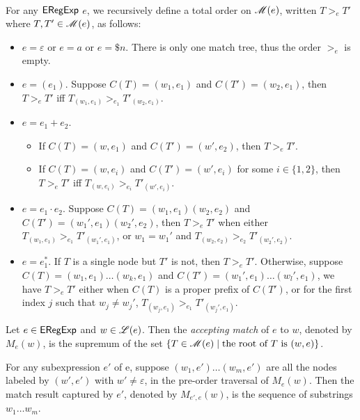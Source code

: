   \begin{definition}
  	\
  	
  	For any ${\sf ERegExp}$ $e$, we recursively define a total order on $\mathscr{M}(e)$, written $T
  	>_e T'$ where $T, T' \in \mathscr{M}(e)$, as follows:
  	\begin{itemize}
  		\item $e = \varepsilon$ or $e = a$ or $e = \$ n$. There is only one match tree, thus the
  		order $>_e$ is empty.
  		
  		\item $e = (e_1)$. Suppose $C (T) = (w_1, e_1)$ and $C (T') = (w_2, e_1)$,
  		then $T >_e T'$ iff $T_{(w_1, e_1)} >_{e_1} T'_{(w_2, e_1)}$.
  		
  		\item $e = e_1 + e_2$.
  		\begin{itemize}
  			\item If $C (T) = (w, e_1)$ and $C (T') = (w', e_2)$, then $T >_e T'$.
  			
  			\item If $C (T) = (w, e_i)$ and $C (T') = (w', e_i)$ for some $i \in \{ 1,
  			2 \}$, then $T >_e T'$ iff $T_{(w, e_i)} >_{e_i} T'_{(w', e_i)}$.
  		\end{itemize}
  		\item $e = e_1 \cdot e_2$. Suppose $C (T) = (w_1, e_1) (w_2, e_2)$ and $C (T') =
  		(w_1', e_1) (w_2', e_2)$, then $T >_e T'$ when either $T_{(w_1, e_1)} >_{e_1}
  		T'_{(w_1', e_1)}$, or $w_1 = w_1'$ and $T_{(w_2, e_2)} >_{e_2} T'_{(w_2', e_2)}$.
  		
  		\item $e = e_1^{\ast}$. If $T$ is a single node but $T'$ is not, then $T >_e T'$.
  		Otherwise, suppose $C(T) = (w_1, e_1) \ldots (w_k, e_1)$ and $C (T') =
  		(w_1', e_1) \ldots (w_l', e_1)$, we have $T >_e T'$ either when $C (T)$
  		is a proper prefix of $C (T')$, or for the first index $j$ such that $w_j
  		\neq w_j'$, $T_{(w_j, e_1)} >_{e_1} T'_{(w_j', e_1)}$.
  	\end{itemize}
  	
  	Let $e \in {\sf ERegExp}$ and $w \in \mathscr{L}(e)$. Then the \emph{accepting match} of $e$ to $w$, denoted by $M_e(w)$, is the supremum of the set $\{ T \in \mathscr{M}(e) \mid \mbox{the root of } T \mbox{ is } (w, e) \}$.
  	
  	For any subexpression $e'$ of e, suppose $(w_1, e') \ldots (w_m, e')$ are
  	all the nodes labeled by $(w', e')$ with $w' \neq \varepsilon$, in the
  	pre-order traversal of $M_e(w)$. Then the match result captured by $e'$, denoted
  	by $M_{e', e} (w)$, is the sequence of substrings $w_1 \ldots w_m$.
  \end{definition}
  
